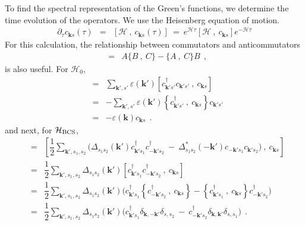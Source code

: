 \documentclass[a4j]{jsarticle}
\begin{document}
To find the spectral representation of the Green's functions, we determine the time evolution of the operators. We use the Heisenberg equation of motion.
%
%
%
%
\begin{eqnarray}
	\partial_{\tau} c_{\bm{k}s} (\tau)
	&=&
	\left[ \mathcal{H} \ , \ c_{\bm{k}s}(\tau) \right]
	\ = \
	e^{\mathcal{H} \tau} \left[ \mathcal{H} \ , \ c_{\bm{k}s} \right] e^{- \mathcal{H} \tau}
\end{eqnarray}
%
%
%
%
For this calculation, the relationship between commutators and anticommutators
%
%
%
%
\begin{eqnarray}
	[AB \ , \ C]
	&=&
	A \{ B \ , \ C \} - \{ A \ , \ C \} B
	\ \ ,
\end{eqnarray}
%
%
%
%
is also useful.
For $\mathcal{H}_{0}$,
%
%
%
%
\begin{eqnarray}
	[ \mathcal{H}_{0} \ , \ c_{\bm{k}s} ]
	&=&
	\sum_{\bm{k}',s'}
	\varepsilon(\bm{k}')
	\left[
		c_{\bm{k}' s'}^{\dagger}
		c_{\bm{k}' s'}
		\ , \
		c_{\bm{k}s}
		\right]
	\nonumber \\[2mm] &=&
	-
	\sum_{\bm{k}',s'}
	\varepsilon(\bm{k}')
	\left\{
	c_{\bm{k}' s'}^{\dagger}
	\ , \
	c_{\bm{k}s}
	\right\}
	c_{\bm{k}' s'}
	\nonumber \\[2mm] &=&
	-
	\varepsilon( \bm{k} )
	c_{\bm{k} s}
	\ \ .
\end{eqnarray}
%
%
%
%
and next, for $\mathcal{H}_{\rm BCS}$,
%
%
%
%
\begin{eqnarray}
	[ \mathcal{H}_{\rm BCS} \ , \ c_{\bm{k}s} ]
	&=&
	\left[
		\dfrac{1}{2}
		\sum_{\bm{k}',s_{1},s_{2}}
		\Big(
		\Delta_{ s_{1} s_{2} }( \bm{k}' )
		c_{\bm{k}' s_{1}}^{\dagger}
		c_{-\bm{k}' s_{2}}^{\dagger}
		\ - \
		\Delta_{ s_{1} s_{2} }^{*}( - \bm{k}' )
		c_{-\bm{k}' s_{1}}
		c_{\bm{k}' s_{2}}
		\Big)
		\ , \
		c_{\bm{k}s}
		\right]
	\nonumber \\[2mm] &=&
	\dfrac{1}{2}
	\sum_{\bm{k}',s_{1},s_{2}}
	\Delta_{ s_{1} s_{2} }( \bm{k}' )
	\left[
		c_{\bm{k}' s_{1}}^{\dagger}
		c_{-\bm{k}' s_{2}}^{\dagger}
		\ , \
		c_{\bm{k}s}
		\right]
	\nonumber \\[2mm] &=&
	\dfrac{1}{2}
	\sum_{\bm{k}',s_{1},s_{2}}
	\Delta_{ s_{1} s_{2} }( \bm{k}' )
	\Big(
	c_{\bm{k}' s_{1}}^{\dagger}
	\left\{
	c_{-\bm{k}' s_{2}}^{\dagger}
	\ , \
	c_{\bm{k}s}
	\right\}
	-
	\left\{
	c_{\bm{k}' s_{1}}^{\dagger}
	\ , \
	c_{\bm{k}s}
	\right\}
	c_{-\bm{k}' s_{2}}^{\dagger}
	\Big)
	\nonumber \\[2mm] &=&
	\dfrac{1}{2}
	\sum_{\bm{k}',s_{1},s_{2}}
	\Delta_{ s_{1} s_{2} }( \bm{k}' )
	\Big(
	c_{\bm{k}' s_{1}}^{\dagger}
	\delta_{\bm{k},-\bm{k}'}
	\delta_{s,s_{2}}
	\ - \
	c_{-\bm{k}' s_{2}}^{\dagger}
	\delta_{\bm{k},\bm{k}'}
	\delta_{s,s_{1}}
	\Big)
	\ \ .
\end{eqnarray}
\end{document}
